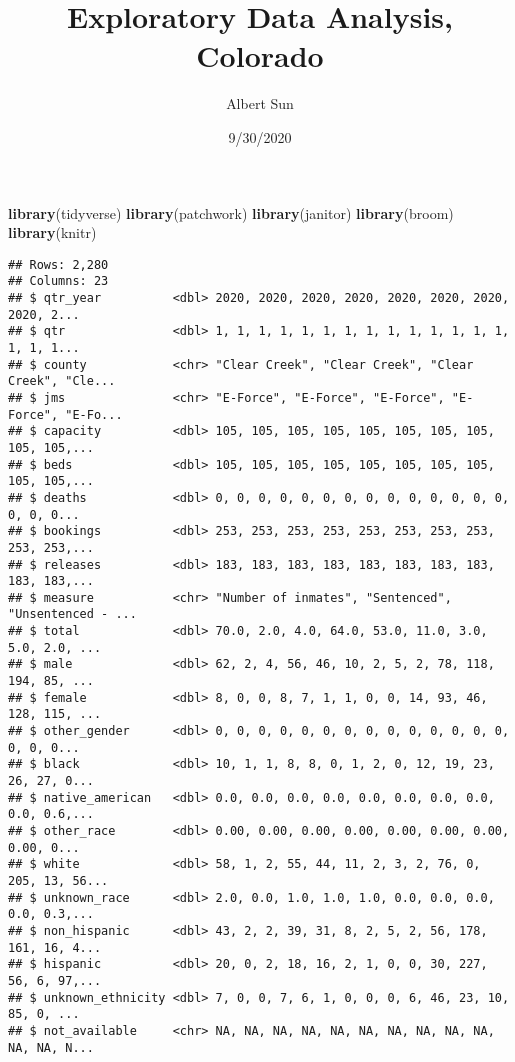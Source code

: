 \documentclass[
]{article}
\title{Exploratory Data Analysis, Colorado}
\author{Albert Sun}
\date{9/30/2020}
\newenvironment{Shaded}{\begin{snugshade}}{\end{snugshade}}
\newcommand{\KeywordTok}[1]{\textcolor[rgb]{0.13,0.29,0.53}{\textbf{#1}}}
\newcommand{\NormalTok}[1]{#1}
\newcommand{\OperatorTok}[1]{\textcolor[rgb]{0.81,0.36,0.00}{\textbf{#1}}}
\newcommand{\StringTok}[1]{\textcolor[rgb]{0.31,0.60,0.02}{#1}}
\begin{document}
\maketitle

\begin{Shaded}
\begin{Highlighting}[]
\KeywordTok{library}\NormalTok{(tidyverse)}
\KeywordTok{library}\NormalTok{(patchwork)}
\KeywordTok{library}\NormalTok{(janitor)}
\KeywordTok{library}\NormalTok{(broom)}
\KeywordTok{library}\NormalTok{(knitr)}
\end{Highlighting}
\end{Shaded}

\begin{Shaded}
\end{Shaded}

\begin{verbatim}
## Rows: 2,280
## Columns: 23
## $ qtr_year          <dbl> 2020, 2020, 2020, 2020, 2020, 2020, 2020, 2020, 2...
## $ qtr               <dbl> 1, 1, 1, 1, 1, 1, 1, 1, 1, 1, 1, 1, 1, 1, 1, 1, 1...
## $ county            <chr> "Clear Creek", "Clear Creek", "Clear Creek", "Cle...
## $ jms               <chr> "E-Force", "E-Force", "E-Force", "E-Force", "E-Fo...
## $ capacity          <dbl> 105, 105, 105, 105, 105, 105, 105, 105, 105, 105,...
## $ beds              <dbl> 105, 105, 105, 105, 105, 105, 105, 105, 105, 105,...
## $ deaths            <dbl> 0, 0, 0, 0, 0, 0, 0, 0, 0, 0, 0, 0, 0, 0, 0, 0, 0...
## $ bookings          <dbl> 253, 253, 253, 253, 253, 253, 253, 253, 253, 253,...
## $ releases          <dbl> 183, 183, 183, 183, 183, 183, 183, 183, 183, 183,...
## $ measure           <chr> "Number of inmates", "Sentenced", "Unsentenced - ...
## $ total             <dbl> 70.0, 2.0, 4.0, 64.0, 53.0, 11.0, 3.0, 5.0, 2.0, ...
## $ male              <dbl> 62, 2, 4, 56, 46, 10, 2, 5, 2, 78, 118, 194, 85, ...
## $ female            <dbl> 8, 0, 0, 8, 7, 1, 1, 0, 0, 14, 93, 46, 128, 115, ...
## $ other_gender      <dbl> 0, 0, 0, 0, 0, 0, 0, 0, 0, 0, 0, 0, 0, 0, 0, 0, 0...
## $ black             <dbl> 10, 1, 1, 8, 8, 0, 1, 2, 0, 12, 19, 23, 26, 27, 0...
## $ native_american   <dbl> 0.0, 0.0, 0.0, 0.0, 0.0, 0.0, 0.0, 0.0, 0.0, 0.6,...
## $ other_race        <dbl> 0.00, 0.00, 0.00, 0.00, 0.00, 0.00, 0.00, 0.00, 0...
## $ white             <dbl> 58, 1, 2, 55, 44, 11, 2, 3, 2, 76, 0, 205, 13, 56...
## $ unknown_race      <dbl> 2.0, 0.0, 1.0, 1.0, 1.0, 0.0, 0.0, 0.0, 0.0, 0.3,...
## $ non_hispanic      <dbl> 43, 2, 2, 39, 31, 8, 2, 5, 2, 56, 178, 161, 16, 4...
## $ hispanic          <dbl> 20, 0, 2, 18, 16, 2, 1, 0, 0, 30, 227, 56, 6, 97,...
## $ unknown_ethnicity <dbl> 7, 0, 0, 7, 6, 1, 0, 0, 0, 6, 46, 23, 10, 85, 0, ...
## $ not_available     <chr> NA, NA, NA, NA, NA, NA, NA, NA, NA, NA, NA, NA, N...
\end{verbatim}
\end{document}
